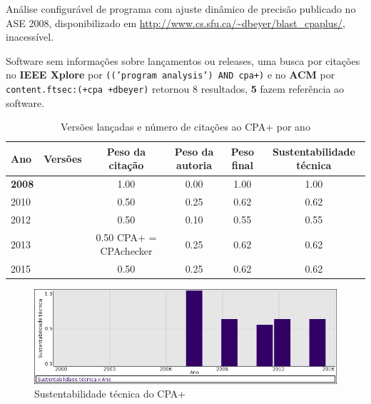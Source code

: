 Análise configurável de programa com ajuste dinâmico de precisão
publicado no ASE 2008,
disponibilizado em \url{http://www.cs.sfu.ca/~dbeyer/blast_cpaplus/},
inacessível.

Software sem informações sobre lançamentos ou releases,
uma busca por citações no {\bf IEEE Xplore} por
\texttt{(('program analysis') AND cpa+)}
e no {\bf ACM} por
\texttt{content.ftsec:(+cpa +dbeyer)}
retornou
8 resultados,
{\bf 5} fazem referência ao software.


\begin{table}[H]
\caption{Versões lançadas e número de citações ao CPA+ por ano}
\centering
\begin{tabular}{| l | c | c | c | c | c |}
  \hline
  Ano & Versões & Peso da citação & Peso da autoria & Peso final & Sustentabilidade técnica \\
  \hline
            {\bf 2008}
          &
          
          &
          1.00
          &
          0.00
          &
          1.00
          &
            {\color{blue} 1.00}
          \\
\hline
            2010
          &
          
          &
          0.50
          &
          0.25
          &
          0.62
          &
            {\color{blue} 0.62}
          \\
\hline
            2012
          &
          
          &
          0.50
          &
          0.10
          &
          0.55
          &
            {\color{blue} 0.55}
          \\
\hline
            2013
          &
          
          &
          0.50
            {\tiny CPA+ = CPAchecker}
          &
          0.25
          &
          0.62
          &
            {\color{blue} 0.62}
          \\
\hline
            2015
          &
          
          &
          0.50
          &
          0.25
          &
          0.62
          &
            {\color{blue} 0.62}
          \\
\hline
\end{tabular}
\end{table}

\begin{figure}[h]
  \center
  \includegraphics[scale=0.50]{imagens/softwares-charts/cpa+.png}
  \caption{Sustentabilidade técnica do CPA+}
\end{figure}


